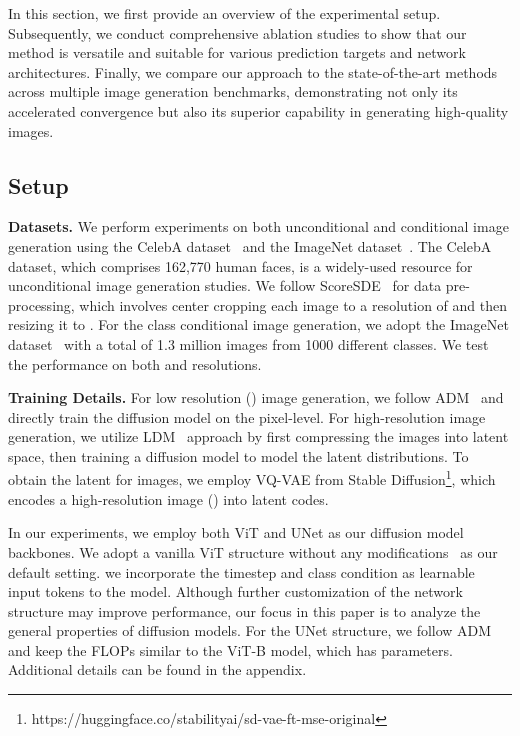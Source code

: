 


In this section, we first provide an overview of the experimental setup. Subsequently, we conduct comprehensive ablation studies to show that our method is versatile and suitable for various prediction targets and network architectures. Finally, we compare our approach to the state-of-the-art methods across multiple image generation benchmarks, demonstrating not only its accelerated convergence but also its superior capability in generating high-quality images.






\subsection{Setup}\label{sec:implementation}

\noindent \textbf{Datasets.}
We perform experiments on both unconditional and conditional image generation using the CelebA dataset~\cite{liu2015CelebA} and the ImageNet dataset~\cite{deng2009imagenet}. 
The CelebA dataset, which comprises 162,770 human faces, is a widely-used resource for unconditional image generation studies. 
We follow ScoreSDE~\cite{2021Scoresde} for data pre-processing, which involves center cropping each image to a resolution of  and then resizing it to . 
For the class conditional image generation, we adopt the ImageNet dataset~\cite{deng2009imagenet} with a total of 1.3 million images from 1000 different classes. We test the performance on both  and  resolutions.


\noindent \textbf{Training Details.}\label{sec:training-detail}
For low resolution () image generation, we follow ADM~\cite{dhariwal2021adm} and directly train the diffusion model on the pixel-level. 
For high-resolution image generation, we utilize LDM~\cite{rombach2022ldm} approach by first compressing the images into latent space, then training a diffusion model to model the latent distributions. 
To obtain the latent for images, we employ VQ-VAE from Stable Diffusion\footnote{https://huggingface.co/stabilityai/sd-vae-ft-mse-original}, which encodes a high-resolution image () into  latent codes.

In our experiments, we employ both ViT and UNet as our diffusion model backbones. We adopt a vanilla ViT structure without any modifications~\cite{vit} as our default setting. we incorporate the timestep  and class condition  as learnable input tokens to the model. 
Although further customization of the network structure may improve performance, our focus in this paper is to analyze the general properties of diffusion models. For the UNet structure, we follow ADM~\cite{dhariwal2021adm} and keep the FLOPs similar to the ViT-B model, which has  parameters. Additional details can be found in the appendix.


